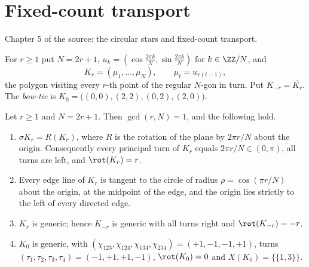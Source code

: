 \chapter{Fixed-count transport}
Chapter 5 of the source: the circular stars and fixed-count transport.

\begin{definition}\label{def:star}\leanok
For $r\geq1$ put $N=2r+1$, $u_k=(\cos\frac{2\pi k}N,\sin\frac{2\pi k}N)$ for
$k\in\ZZ/N$, and
\[
K_r=(\mu_1,\ldots,\mu_N),\qquad \mu_t=u_{r(t-1)},
\]
the polygon visiting every $r$-th point of the regular $N$-gon in turn. Put
$K_{-r}=\overline{K_r}$. The \emph{bow-tie} is
$K_0=\bigl((0,0),(2,2),(0,2),(2,0)\bigr)$.
\end{definition}

\begin{lemma}\label{lem:star-generic}\leanok
Let $r\geq1$ and $N=2r+1$. Then $\gcd(r,N)=1$, and the following hold.
\begin{enumerate}
\item[(i)] $\sigma K_r=R(K_r)$, where $R$ is the rotation of the plane by
$2\pi r/N$ about the origin. Consequently every principal turn of $K_r$
equals $2\pi r/N\in(0,\pi)$, all turns are left, and $\rot(K_r)=r$.
\item[(ii)] Every edge line of $K_r$ is tangent to the circle of radius
$\rho=\cos(\pi r/N)$ about the origin, at the midpoint of the edge, and the
origin lies strictly to the left of every directed edge.
\item[(iii)] $K_r$ is generic; hence $K_{-r}$ is generic with all turns
right and $\rot(K_{-r})=-r$.
\item[(iv)] $K_0$ is generic, with
$(\chi_{123},\chi_{124},\chi_{134},\chi_{234})=(+1,-1,-1,+1)$, turns
$(\tau_1,\tau_2,\tau_3,\tau_4)=(-1,+1,+1,-1)$, $\rot(K_0)=0$ and
$X(K_0)=\{\{1,3\}\}$.
\end{enumerate}

\end{lemma}
